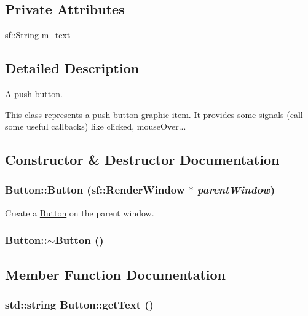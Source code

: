 \subsection*{Private Attributes}
\begin{CompactItemize}
\item 
sf::String \hyperlink{classButton_524d038c09c3f5f819d5cae310a591e9}{m\_\-text}
\end{CompactItemize}


\subsection{Detailed Description}
A push button. 

This class represents a push button graphic item. It provides some signals (call some useful callbacks) like clicked, mouseOver... 

\subsection{Constructor \& Destructor Documentation}
\hypertarget{classButton_f803adbf034e7b365b563ac1c837bf60}{
\subsubsection[Button]{\setlength{\rightskip}{0pt plus 5cm}Button::Button (sf::RenderWindow $\ast$ {\em parentWindow})}}
\label{classButton_f803adbf034e7b365b563ac1c837bf60}




Create a \hyperlink{classButton}{Button} on the parent window. \hypertarget{classButton_2a001eb9c3cc8ae54768a850dd345002}{
\subsubsection[$\sim$Button]{\setlength{\rightskip}{0pt plus 5cm}Button::$\sim$Button ()}}
\label{classButton_2a001eb9c3cc8ae54768a850dd345002}




\subsection{Member Function Documentation}
\hypertarget{classButton_fd57748d0bd0f5fa35d765052d281169}{
\subsubsection[getText]{\setlength{\rightskip}{0pt plus 5cm}std::string Button::getText ()}}
\label{classButton_fd57748d0bd0f5fa35d765052d281169}




